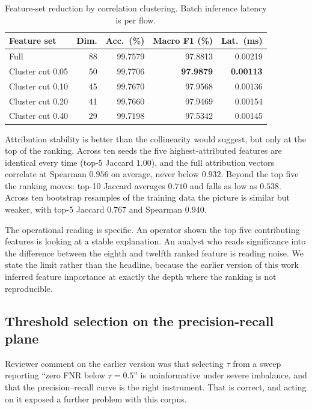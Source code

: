 \documentclass{ieeeaccess}
\begin{document}
\begin{table}[!t]
\caption{Feature-set reduction by correlation clustering. Batch inference latency is per flow.}
\centering
\label{tab:reduced}
\footnotesize
\setlength{\tabcolsep}{4pt}
\renewcommand{\arraystretch}{1.2}
\begin{tabular}{@{}lrrrr@{}}
\toprule
\textbf{Feature set} & \textbf{Dim.} & \textbf{Acc.\ (\%)} & \textbf{Macro F1 (\%)} & \textbf{Lat.\ (ms)} \\
\midrule
Full                      & 88 & 99.7579 & 97.8813 & 0.00219 \\
Cluster cut 0.05          & 50 & 99.7706 & \textbf{97.9879} & \textbf{0.00113} \\
Cluster cut 0.10          & 45 & 99.7670 & 97.9568 & 0.00136 \\
Cluster cut 0.20          & 41 & 99.7660 & 97.9469 & 0.00154 \\
Cluster cut 0.40          & 29 & 99.7198 & 97.5342 & 0.00145 \\
\bottomrule
\end{tabular}
\end{table}

Attribution stability is better than the collinearity would suggest, but only at
the top of the ranking. Across ten seeds the five highest-attributed features are
identical every time (top-5 Jaccard $1.00$), and the full attribution vectors
correlate at Spearman $0.956$ on average, never below $0.932$. Beyond the top
five the ranking moves: top-10 Jaccard averages $0.710$ and falls as low as
$0.538$. Across ten bootstrap resamples of the training data the picture is
similar but weaker, with top-5 Jaccard $0.767$ and Spearman $0.940$.

The operational reading is specific. An operator shown the top five contributing
features is looking at a stable explanation. An analyst who reads significance
into the difference between the eighth and twelfth ranked feature is reading
noise. We state the limit rather than the headline, because the earlier version of
this work inferred feature importance at exactly the depth where the ranking is
not reproducible.

\subsection{Threshold selection on the precision-recall plane}
\label{sec:threshold}
Reviewer comment on the earlier version was that selecting $\tau$ from a sweep
reporting ``zero FNR below $\tau=0.5$'' is uninformative under severe imbalance,
and that the precision--recall curve is the right instrument. That is correct,
and acting on it exposed a further problem with this corpus.
\end{document}
